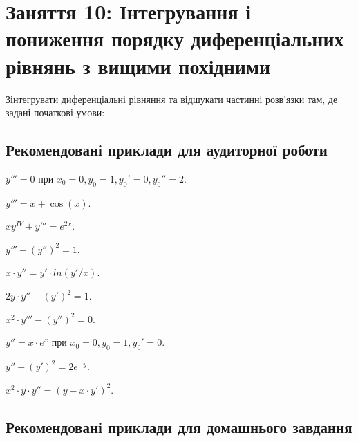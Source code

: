 \section*{Заняття 10: Інтегрування і пониження порядку диференціальних рівнянь з вищими похідними}

Зінтегрувати диференціальні рівняння та відшукати частинні розв'язки там, де задані початкові умови:

\subsection*{Рекомендовані приклади для аудиторної роботи}

\begin{problem}
	$y''' = 0$ при $x_0 = 0, y_0 = 1, y_0' = 0, y_0''=2$.
\end{problem}

\begin{problem}
	$y''' = x + \cos (x)$.
\end{problem}

\begin{problem}
	$x y^{IV} + y''' = e^{2x}$.
\end{problem}

\begin{problem}
	$y''' - (y'')^2 = 1$.
\end{problem}

\begin{problem}
	$x \cdot y'' = y' \cdot ln (y' / x)$.
\end{problem}

\begin{problem}
	$2 y \cdot y'' - (y')^2 = 1$.
\end{problem}

\begin{problem}
	$x^2 \cdot y''' - (y'')^2 = 0$.
\end{problem}

\begin{problem}
	$y'' = x \cdot e^x$ при $x_0 = 0, y_0 = 1, y_0' = 0$.
\end{problem}

\begin{problem}
	$y'' + (y')^2 = 2 e^{-y}$.
\end{problem}

\begin{problem}
	$x^2 \cdot y \cdot y'' = (y - x \cdot y')^2$.
\end{problem}

\subsection*{Рекомендовані приклади для домашнього завдання}

